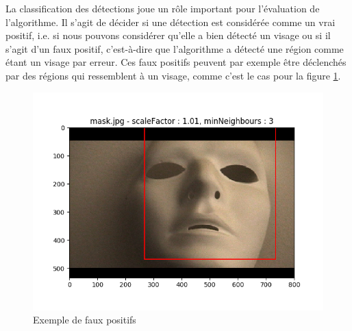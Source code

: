 \documentclass[a4paper,11pt]{article}
\begin{document}
        La classification des détections joue un rôle important pour l'évaluation de l'algorithme.
        Il s'agit de décider si une détection est considérée comme un vrai positif, i.e. si nous pouvons considérer qu'elle a bien détecté un visage ou si il s'agit d'un faux positif, c'est-à-dire que l'algorithme a détecté une région comme étant un visage par erreur. Ces faux positifs peuvent par exemple être déclenchés par des régions qui ressemblent à un visage, comme c'est le cas pour la figure \ref{fig:mask_faux_positif}.
	    \begin{figure}[H]
	        \begin{center}
	    	\includegraphics[scale = 0.6]{images/mask_1,01_3.png}
	    	\caption{Exemple de faux positifs}
	    	\label{fig:mask_faux_positif}
	        \end{center}
	    \end{figure}
\end{document}
